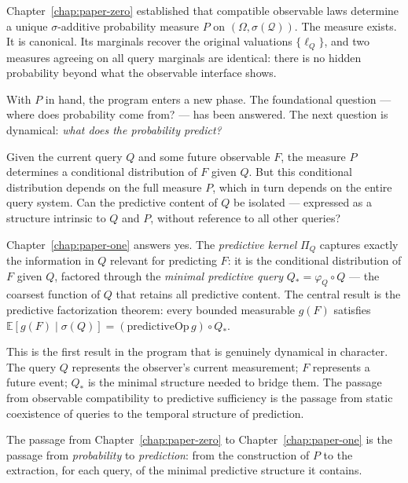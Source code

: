 
Chapter~\ref{chap:paper-zero} established that compatible observable
laws determine a unique $\sigma$-additive probability measure $P$ on
$(\Omega, \sigma(\mathcal{Q}))$.  The measure exists.  It is
canonical.  Its marginals recover the original valuations $\{\ell_Q\}$,
and two measures agreeing on all query marginals are identical: there
is no hidden probability beyond what the observable interface shows.

With $P$ in hand, the program enters a new phase.  The foundational
question --- where does probability come from? --- has been answered.
The next question is dynamical: \emph{what does the probability predict?}

\medskip

Given the current query $Q$ and some future observable $F$, the
measure $P$ determines a conditional distribution of $F$ given $Q$.
But this conditional distribution depends on the full measure $P$,
which in turn depends on the entire query system.  Can the predictive
content of $Q$ be isolated --- expressed as a structure intrinsic to
$Q$ and $P$, without reference to all other queries?

Chapter~\ref{chap:paper-one} answers yes.  The \emph{predictive
kernel} $\Pi_Q$ captures exactly the information in $Q$ relevant for
predicting $F$: it is the conditional distribution of $F$ given $Q$,
factored through the \emph{minimal predictive query} $Q_* = \varphi_Q
\circ Q$ --- the coarsest function of $Q$ that retains all predictive
content.  The central result is the predictive factorization theorem:
every bounded measurable $g(F)$ satisfies
$\mathbb{E}[g(F) \mid \sigma(Q)] = (\mathrm{predictiveOp}\,g) \circ Q_*$.

\medskip

This is the first result in the program that is genuinely dynamical
in character.  The query $Q$ represents the observer's current
measurement; $F$ represents a future event; $Q_*$ is the minimal
structure needed to bridge them.  The passage from observable
compatibility to predictive sufficiency is the passage from static
coexistence of queries to the temporal structure of prediction.

\medskip

The passage from Chapter~\ref{chap:paper-zero} to
Chapter~\ref{chap:paper-one} is the passage from \emph{probability}
to \emph{prediction}: from the construction of $P$ to the extraction,
for each query, of the minimal predictive structure it contains.
